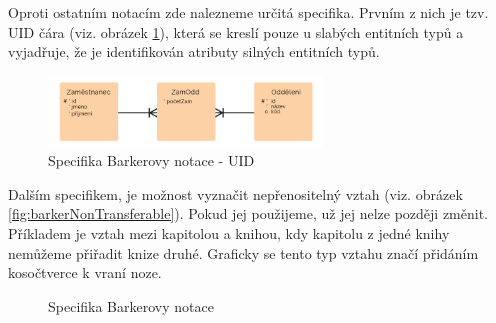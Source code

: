 \documentclass[czech,bachelor,public,dept460,male,oneside]{diploma}
\begin{document}
		Oproti ostatním notacím zde nalezneme určitá specifika. Prvním z nich je tzv. UID čára (viz. obrázek \ref{fig:barkerUid}), která se kreslí pouze u slabých entitních typů a vyjadřuje, že je identifikován atributy silných entitních typů. 
		
		\begin{figure}[!h]
			\centering
			\includegraphics[width=0.65\textwidth]{Figures/BarkerUid}
			\caption[Specifika Barkerovy notace - UID]{Specifika Barkerovy notace - UID}
			\label{fig:barkerUid}
		\end{figure}
		
		Dalším specifikem, je možnost vyznačit nepřenositelný vztah (viz. obrázek \ref{fig:barkerNonTransferable}). Pokud jej použijeme, už jej nelze později změnit. Příkladem je vztah mezi kapitolou a knihou, kdy kapitolu z jedné knihy nemůžeme přiřadit knize druhé. Graficky se tento typ vztahu značí přidáním kosočtverce k vraní noze.
		
		\begin{figure}[!h]
			\centering
			\qquad
			\caption[Specifika Barkerovy notace]{Specifika Barkerovy notace}
		\end{figure}
	
\end{document}
